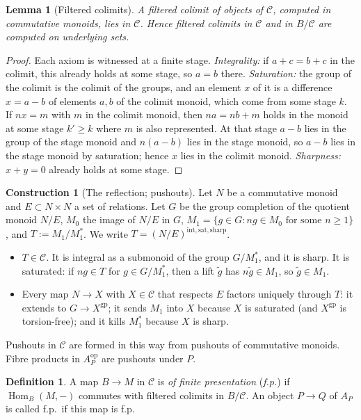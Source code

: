 \documentclass[11pt]{article}
\newtheorem{lemma}[theorem]{Lemma}
\theoremstyle{definition}
\newtheorem{definition}[theorem]{Definition}
\newtheorem{construction}[theorem]{Construction}
\theoremstyle{remark}
\newcommand{\cC}{\mathcal{C}}
\newcommand{\gp}{\mathrm{gp}}
\newcommand{\Hom}{\operatorname{Hom}}
\newcommand{\rfl}{\mathrm{int,sat,sharp}}
\begin{document}
\begin{lemma}[Filtered colimits]\label{lem:filt}
A filtered colimit of objects of $\cC$, computed in commutative monoids, lies in $\cC$. Hence filtered colimits in $\cC$ and in $B/\cC$ are computed on underlying sets.
\end{lemma}
\begin{proof}
Each axiom is witnessed at a finite stage. \emph{Integrality:} if $a+c=b+c$ in the colimit, this already holds at some stage, so $a=b$ there. \emph{Saturation:} the group of the colimit is the colimit of the groups, and an element $x$ of it is a difference $x=a-b$ of elements $a,b$ of the colimit monoid, which come from some stage $k$. If $nx=m$ with $m$ in the colimit monoid, then $na=nb+m$ holds in the monoid at some stage $k'\ge k$ where $m$ is also represented. At that stage $a-b$ lies in the group of the stage monoid and $n(a-b)$ lies in the stage monoid, so $a-b$ lies in the stage monoid by saturation; hence $x$ lies in the colimit monoid. \emph{Sharpness:} $x+y=0$ already holds at some stage.
\end{proof}

\begin{construction}[The reflection; pushouts]\label{con:refl}
Let $N$ be a commutative monoid and $E\subset N\times N$ a set of relations. Let $G$ be the group completion of the quotient monoid $N/E$, $M_0$ the image of $N/E$ in $G$, $M_1=\{g\in G: ng\in M_0\text{ for some }n\ge1\}$, and $T:=M_1/M_1^*$. We write $T=(N/E)^{\rfl}$.
\begin{itemize}
\item $T\in\cC$. It is integral as a submonoid of the group $G/M_1^*$, and it is sharp. It is saturated: if $ng\in T$ for $g\in G/M_1^*$, then a lift $\tilde g$ has $n\tilde g\in M_1$, so $\tilde g\in M_1$.
\item Every map $N\to X$ with $X\in\cC$ that respects $E$ factors uniquely through $T$: it extends to $G\to X^{\gp}$; it sends $M_1$ into $X$ because $X$ is saturated (and $X^{\gp}$ is torsion-free); and it kills $M_1^*$ because $X$ is sharp.
\end{itemize}
Pushouts in $\cC$ are formed in this way from pushouts of commutative monoids. Fibre products in $A_P^{\mathrm{op}}$ are pushouts under $P$.
\end{construction}

\begin{definition}\label{def:fp}
A map $B\to M$ in $\cC$ is \emph{of finite presentation} (\emph{f.p.}) if $\Hom_B(M,-)$ commutes with filtered colimits in $B/\cC$. An object $P\to Q$ of $A_P$ is called f.p.\ if this map is f.p.
\end{definition}
\end{document}
